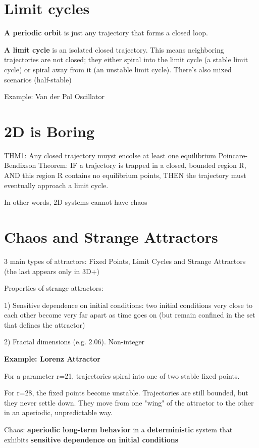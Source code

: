 \section*{Limit cycles}

\textbf{A periodic orbit} is just any trajectory that forms a closed loop.

\textbf{A limit cycle} is an isolated closed trajectory.
This means neighboring trajectories are not closed; they either spiral into the limit cycle (a stable limit cycle) or spiral away from it (an unstable limit cycle).
There's also mixed scenarios (half-stable)

Example: Van der Pol Oscillator

\section*{2D is Boring}


THM1: Any closed trajectory muyst encolse at least one equilibrium
Poincare-Bendixson Theorem: IF a trajectory is trapped in a closed, bounded region R, 
AND this region R contains no equilibrium points,
THEN the trajectory must eventually approach a limit cycle.

In other words, 2D systems cannot have chaos

\section*{Chaos and Strange Attractors}

3 main types of attractors: Fixed Points, Limit Cycles and Strange Attractors (the last
appears only in 3D+)

Properties of strange attractors:
  
1) Sensitive dependence on initial conditions: two initial conditions very
  close to each other become very far apart as time goes on (but remain confined in the set
  that defines the attractor)

2) Fractal dimensions (e.g. $2.06$). Non-integer

\textbf{Example: Lorenz Attractor}

For a parameter r=21, trajectories spiral into one of two stable fixed points.

For r=28, the fixed points become unstable. Trajectories are still
  bounded, but they never settle down. They move from one "wing" of the
  attractor to the other in an aperiodic, unpredictable way.

Chaos: \textbf{aperiodic long-term behavior} in a \textbf{deterministic} system that exhibits
\textbf{sensitive dependence on initial conditions}
